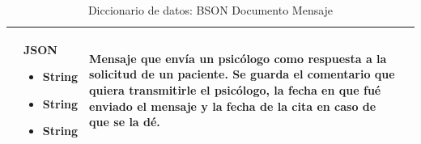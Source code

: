 \begin{table}[htpb]
\begin{tabularx}{\textwidth}{|l|X|X|X|}
\begin{itemize}
\end{itemize}                       & JSON \begin{itemize}
\item String 
\item String 
\item String 
\end{itemize}          & Mensaje que envía un psicólogo como respuesta a la solicitud de un paciente. Se guarda el comentario que quiera transmitirle el psicólogo, la fecha en que fué enviado el mensaje y la fecha de la cita en caso de que se la dé.                                      \\ \hline
\end{tabularx}
\caption{Diccionario de datos: BSON Documento Mensaje}
\label{fig:dic_datos_BSON_1}
\end{table}

